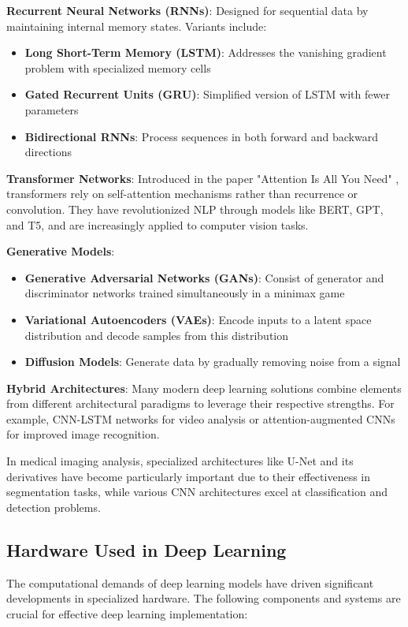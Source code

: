 \textbf{Recurrent Neural Networks (RNNs)}:
Designed for sequential data by maintaining internal memory states. Variants include:
\begin{itemize}
  \item \textbf{Long Short-Term Memory (LSTM)}: Addresses the vanishing gradient problem with specialized memory cells \cite{hochreiter1997long}
  \item \textbf{Gated Recurrent Units (GRU)}: Simplified version of LSTM with fewer parameters \cite{cho2014learning}
  \item \textbf{Bidirectional RNNs}: Process sequences in both forward and backward directions
\end{itemize}

\textbf{Transformer Networks}:
Introduced in the paper "Attention Is All You Need" \cite{vaswani2017attention}, transformers rely on self-attention mechanisms rather than recurrence or convolution. They have revolutionized NLP through models like BERT, GPT, and T5, and are increasingly applied to computer vision tasks.

\textbf{Generative Models}:
\begin{itemize}
  \item \textbf{Generative Adversarial Networks (GANs)}: Consist of generator and discriminator networks trained simultaneously in a minimax game \cite{goodfellow2014generative}
  \item \textbf{Variational Autoencoders (VAEs)}: Encode inputs to a latent space distribution and decode samples from this distribution \cite{kingma2013auto}
  \item \textbf{Diffusion Models}: Generate data by gradually removing noise from a signal \cite{ho2020denoising}
\end{itemize}

\textbf{Hybrid Architectures}:
Many modern deep learning solutions combine elements from different architectural paradigms to leverage their respective strengths. For example, CNN-LSTM networks for video analysis or attention-augmented CNNs for improved image recognition.

In medical imaging analysis, specialized architectures like U-Net and its derivatives have become particularly important due to their effectiveness in segmentation tasks, while various CNN architectures excel at classification and detection problems.

\subsection{Hardware Used in Deep Learning}
\label{sec:dl_hardware}
The computational demands of deep learning models have driven significant developments in specialized hardware. The following components and systems are crucial for effective deep learning implementation:

